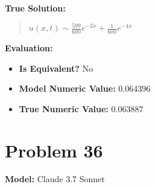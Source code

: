 \documentclass{article}
\begin{document}
\textbf{True Solution:}
\begin{quote}
$u(x, t) \sim \frac{599}{600}e^{-2x} + \frac{1}{600}e^{-4x}$
\end{quote}

\textbf{Evaluation:}
\begin{itemize}
\item \textbf{Is Equivalent?} No
\item \textbf{Model Numeric Value:} 0.064396
\item \textbf{True Numeric Value:} 0.063887
\end{itemize}
\vspace{1cm}
\section*{Problem 36}
\textbf{Model:} Claude 3.7 Sonnet
\end{document}

